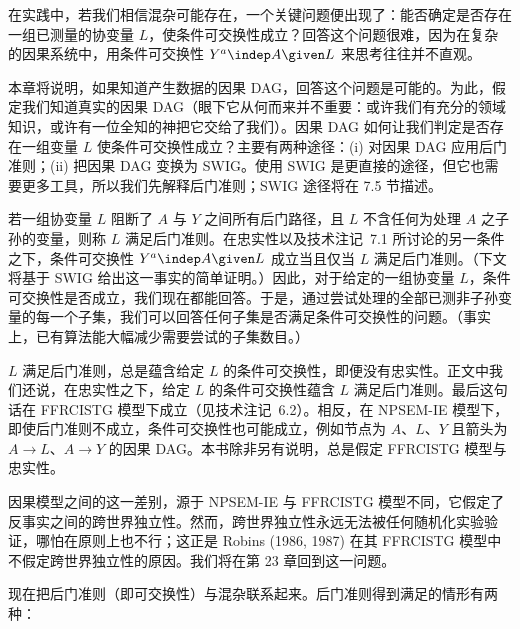 
在实践中，若我们相信混杂可能存在，一个关键问题便出现了：能否确定是否存在一组已测量的协变量 $L$，使条件可交换性成立？回答这个问题很难，因为在复杂的因果系统中，用条件可交换性 $Y^{a}\indep A\given L$ 来思考往往并不直观。

本章将说明，如果知道产生数据的因果 DAG，回答这个问题是可能的。为此，假定我们知道真实的因果 DAG（眼下它从何而来并不重要：或许我们有充分的领域知识，或许有一位全知的神把它交给了我们）。因果 DAG 如何让我们判定是否存在一组变量 $L$ 使条件可交换性成立？主要有两种途径：(i) 对因果 DAG 应用后门准则；(ii) 把因果 DAG 变换为 SWIG。使用 SWIG 是更直接的途径，但它也需要更多工具，所以我们先解释后门准则；SWIG 途径将在 7.5 节描述。

若一组协变量 $L$ 阻断了 $A$ 与 $Y$ 之间所有后门路径，且 $L$ 不含任何为处理 $A$ 之子孙的变量，则称 $L$ 满足后门准则。在忠实性以及技术注记~7.1 所讨论的另一条件之下，条件可交换性 $Y^{a}\indep A\given L$ 成立当且仅当 $L$ 满足后门准则。（下文将基于 SWIG 给出这一事实的简单证明。）因此，对于给定的一组协变量 $L$，条件可交换性是否成立，我们现在都能回答。于是，通过尝试处理的全部已测非子孙变量的每一个子集，我们可以回答任何子集是否满足条件可交换性的问题。（事实上，已有算法能大幅减少需要尝试的子集数目。）

\renewcommand{\TPname}{技术注记（Technical Point）}
\begin{techpoint}[条件可交换性是否蕴含后门准则？]
$L$ 满足后门准则，总是蕴含给定 $L$ 的条件可交换性，即便没有忠实性。正文中我们还说，在忠实性之下，给定 $L$ 的条件可交换性蕴含 $L$ 满足后门准则。最后这句话在 FFRCISTG 模型下成立（见技术注记~6.2）。相反，在 NPSEM-IE 模型下，即使后门准则不成立，条件可交换性也可能成立，例如节点为 $A$、$L$、$Y$ 且箭头为 $A\to L$、$A\to Y$ 的因果 DAG。本书除非另有说明，总是假定 FFRCISTG 模型与忠实性。

因果模型之间的这一差别，源于 NPSEM-IE 与 FFRCISTG 模型不同，它假定了反事实之间的跨世界独立性。然而，跨世界独立性永远无法被任何随机化实验验证，哪怕在原则上也不行；这正是 Robins (1986, 1987) 在其 FFRCISTG 模型中不假定跨世界独立性的原因。我们将在第 23 章回到这一问题。
\end{techpoint}
\renewcommand{\TPname}{技术注记}

现在把后门准则（即可交换性）与混杂联系起来。后门准则得到满足的情形有两种：

